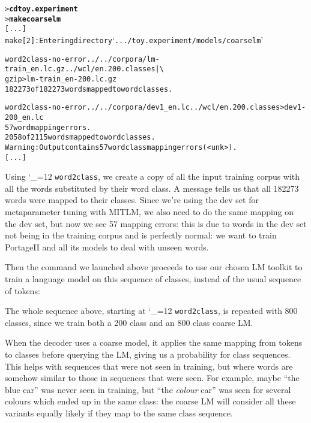 \documentclass[11pt,letterpaper]{article}
\newcommand{\bs}{\textbackslash{}}
\newcommand{\PS}{PortageII\xspace}
\def\code{\begingroup\catcode`\_=12 \codex}
\newcommand{\codex}[1]{\texttt{#1}\endgroup}
\begin{document}
\begin{small}
\begin{alltt}
   > \textbf{cd toy.experiment}
   > \textbf{make coarselm}
   [...]
   make[2]: Entering directory `.../toy.experiment/models/coarselm'

   word2class -no-error ../../corpora/lm-train_en.lc.gz ../wcl/en.200.classes | \bs
      gzip > lm-train_en-200.lc.gz
   182273 of 182273 words mapped to word classes.

   word2class -no-error ../../corpora/dev1_en.lc ../wcl/en.200.classes > dev1-200_en.lc
   57 word mapping errors.
   2058 of 2115 words mapped to word classes.
   Warning: Output contains 57 word class mapping errors (<unk>).
   [...]
\end{alltt}
\end{small}

Using \code{word2class}, we create a copy of all the input training corpus with
all the words substituted by their word class. A message tells us that all
182273 words were mapped to their classes. Since we're using the dev set for
metaparameter tuning with MITLM, we also need to do the same mapping on the dev
set, but now we see 57 mapping errors: this is due to words in the dev set not
being in the training corpus and is perfectly normal: we want to train \PS and
all its models to deal with unseen words.

Then the command we launched above proceeds to use our chosen LM toolkit to
train a language model on this sequence of classes, instead of the usual
sequence of tokens:

The whole sequence above, starting at \code{word2class}, is repeated with 800
classes, since we train both a 200 class and an 800 class coarse LM.

When the decoder uses a coarse model, it applies the same mapping from tokens
to classes before querying the LM, giving us a probability for class
sequences. This helps with sequences that were not seen in training, but where
words are somehow similar to those in sequences that were seen. For example,
maybe ``the blue car'' was never seen in training, but ``the \emph{colour}
car'' was seen for several colours which ended up in the same class: the coarse
LM will consider all these variants equally likely if they map to the same
class sequence.
\end{document}
